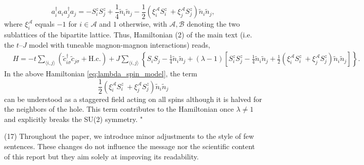 \documentclass[%
 manuscript,
 amsmath,amssymb,
 aps, onecolumn,
prl,
]{revtex4-1}
\newcommand{\mean}[1]{\langle#1\rangle}
\begin{document}
\begin{equation}
    a_i^\dag a_i a_j^\dag a_j = -S_i^z S_j^z + \frac{1}{4}\tilde{n}_i\tilde{n}_j - \frac{1}{2}\left(\xi_i^\mathcal{A} S_i^z \ + \xi_j^\mathcal{A} S_j^z \right)\tilde{n}_i\tilde{n}_j,
\end{equation}
%
where $\xi_i^\mathcal{A}$ equals $-1$ for $i\in\mathcal{A}$ and $1$ otherwise, with $\mathcal{A},\mathcal{B}$ denoting the two sublattices of the bipartite lattice. Thus, Hamiltonian (2) of the main text (i.e. the $t$--$J$ model with tuneable magnon-magnon interactions) reads,
%
\begin{equation}
        \begin{aligned}
    	&H = -t\sum_{\mean{i,j}}\left(\tilde{c}_{i\sigma}^\dagger\tilde{c}_{j\sigma} + \text{H.c.}\right)
	+ J\sum_{\mean{i,j}}\left\{S_i S_j - \frac{1}{4}\tilde{n}_i\tilde{n}_j 
	+ \left(\lambda-1\right) \left[S_i^z S_j^z - \frac{1}{4}\tilde{n}_i\tilde{n}_j + \frac{1}{2}\left(\xi_i^\mathcal{A} S_i^z \ + \xi_j^\mathcal{A} S_j^z \right)\tilde{n}_i\tilde{n}_j\right] \right\}.
	\end{aligned}
	\label{eq:lambda_spin_model}
\end{equation}
In the above Hamiltonian \eqref{eq:lambda_spin_model}, the term
%
\begin{equation}
    \frac{1}{2}\left(\xi_i^\mathcal{A} S_i^z \ + \xi_j^\mathcal{A} S_j^z \right)\tilde{n}_i\tilde{n}_j
        \label{eq:staggered_term}
\end{equation}
%
can be understood as a staggered field acting on all spins although it is halved for the neighbors of the hole. This term contributes to the Hamiltonian once $\lambda \neq 1$ and explicitly breaks the SU(2) symmetry.  
"


(17) Throughout the paper, we introduce minor adjustments to the style of few sentences. These changes do not influence the message nor the scientific content of this report but they aim solely at improving its readability.




\end{document}

